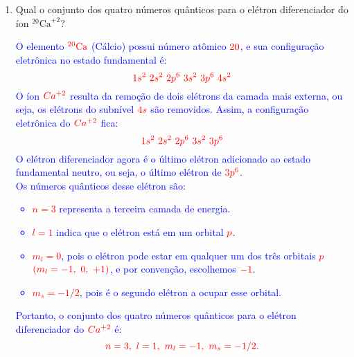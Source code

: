 \documentclass[a4paper, 12pt]{article}
\begin{document}
\begin{enumerate}
	\item Qual o conjunto dos quatro números quânticos para o elétron diferenciador do íon \(^{20}\text{Ca}^{+2}\)?
	      \\[10pt]
	      \textcolor{blue}{
		      O elemento \(\textcolor{red}{^{20}\text{Ca}}\) (Cálcio) possui número atômico \(\textcolor{red}{20}\), e sua configuração eletrônica no estado fundamental é:
		      \[
			      \textcolor{red}{1s^2 \ 2s^2 \ 2p^6 \ 3s^2 \ 3p^6 \ 4s^2}
		      \]
		      \textcolor{blue}{O íon \(\textcolor{red}{Ca^{+2}}\) resulta da remoção de dois elétrons da camada mais externa, ou seja, os elétrons do subnível \(\textcolor{red}{4s}\) são removidos. Assim, a configuração eletrônica do \(\textcolor{red}{Ca^{+2}}\) fica:}
		      \[
			      \textcolor{red}{1s^2 \ 2s^2 \ 2p^6 \ 3s^2 \ 3p^6}
		      \]
		      \textcolor{blue}{O elétron diferenciador agora é o último elétron adicionado ao estado fundamental neutro, ou seja, o último elétron de \(\textcolor{red}{3p^6}\).} \\[2mm]		      
		      \textcolor{blue}{Os números quânticos desse elétron são:}
		      \begin{itemize}
			      \item[] \textcolor{red}{\(n = 3\)} representa a terceira camada de energia.
			      \item[] \textcolor{red}{\(l = 1\)} indica que o elétron está em um orbital \(\textcolor{red}{p}\).
			      \item[] \textcolor{red}{\(m_l = 0\)}, pois o elétron pode estar em qualquer um dos três orbitais \textcolor{red}{\(p\)} \(\textcolor{red}{(m_l = -1, \ 0, \ +1)}\), e por convenção, escolhemos \(\textcolor{red}{-1}\).
			      \item[] \textcolor{red}{\(m_s = -1/2\)}, pois é o segundo elétron a ocupar esse orbital.
		      \end{itemize}
		      
		      \textcolor{blue}{Portanto, o conjunto dos quatro números quânticos para o elétron diferenciador do \(\textcolor{red}{Ca^{+2}}\) é:}
		      \[
			      \textcolor{red}{n = 3, \ l = 1, \ m_l = -1, \ m_s = -1/2.}
		      \]
	      }
	      
\end{enumerate}
\end{document}
